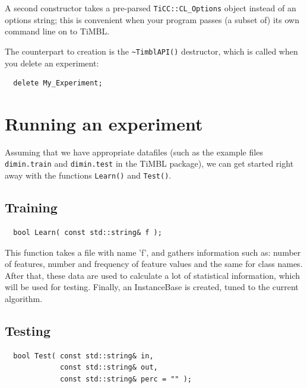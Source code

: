 \documentclass{report}
\begin{document}
A second constructor takes a pre-parsed {\tt TiCC::CL\_Options}
object instead of an options string; this is convenient when your
program passes (a subset of) its own command line on to TiMBL.

The counterpart to creation is the {\tt \~{ }TimblAPI()} destructor,
which is called when you delete an experiment:

\begin{footnotesize}
\begin{verbatim}
  delete My_Experiment;
\end{verbatim}
\end{footnotesize}

\section{Running an experiment}

Assuming that we have appropriate datafiles (such as the example files {\tt
dimin.train} and {\tt dimin.test} in the TiMBL package), we can get
started right away with the functions {\tt Learn()} and {\tt Test()}.

\subsection{Training}
\begin{footnotesize}
\begin{verbatim}
  bool Learn( const std::string& f );
\end{verbatim}
\end{footnotesize}

This function takes a file with name 'f', and gathers information
such as: number of features, number and frequency of feature values and
the same for class names. After that, these data are used to calculate
a lot of statistical information, which will be used for
testing. Finally, an InstanceBase is created, tuned to the current
algorithm.

\subsection{Testing}
\begin{footnotesize}
\begin{verbatim}
  bool Test( const std::string& in,
             const std::string& out,
             const std::string& perc = "" );
\end{verbatim}
\end{footnotesize}
\end{document}
